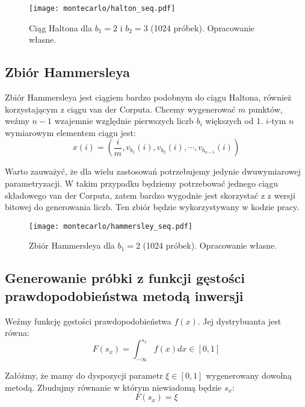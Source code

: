 \documentclass[../main.tex]{subfiles}
\begin{document}
\begin{figure}[h]
  \centering
  \texttt{[image: montecarlo/halton\_seq.pdf]}
  \caption{Ciąg Haltona dla $b_1=2$ i $b_2=3$ (1024 próbek). Opracowanie własne.}
  \label{fig:HaltonSamples}
\end{figure}

\subsection{Zbiór Hammersleya}

Zbiór Hammersleya jest ciągiem bardzo podobnym do ciągu Haltona, również korzystającym z ciągu van der Corputa. Chcemy wygenerować $m$ punktów, weźmy $n-1$ wzajemnie względnie pierwszych liczb $b_i$ większych od 1. $i$-tym $n$ wymiarowym elementem ciągu jest:
\begin{equation}
  x(i) = \left(
    \frac{i}{m}, v_{b_1}(i), v_{b_2}(i), \cdots, v_{b_{n-1}}(i)
  \right)
\end{equation}

Warto zauważyć, że dla wielu zastosowań potrzebujemy jedynie dwuwymiarowej parametryzacji. W takim przypadku będziemy potrzebować jednego ciągu składowego van der Corputa, zatem bardzo wygodnie jest skorzystać z  z wersji bitowej do generowania liczb. Ten zbiór będzie wykorzystywany w kodzie pracy.

\begin{figure}[h]
  \centering
  \texttt{[image: montecarlo/hammersley\_seq.pdf]}
  \caption{Zbiór Hammersleya dla $b_1=2$ (1024 próbek). Opracowanie własne.}
  \label{fig:HammersleySamples}
\end{figure}

\subsection{Generowanie próbki z funkcji gęstości prawdopodobieństwa metodą inwersji}
\label{section:pdfsampling}

Weźmy funkcję gęstości prawdopodobieństwa $f(x)$. Jej dystrybuanta jest równa:
\begin{equation}
F(s_x) = \int_{-\infty}^{s_{x}} f(x) dx \in [0,1] 
\end{equation}

Załóżmy, że mamy do dyspozycji parametr $\xi \in [0,1]$ wygenerowany dowolną metodą. Zbudujmy równanie w którym niewiadomą będzie $s_x$:
\begin{equation}
F(s_x) = \xi
\label{eq:mc_inverse_equation_to_solve}
\end{equation}
\end{document}
